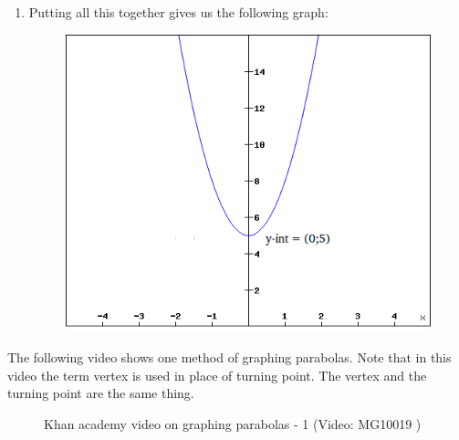 {\begin{mdframed}[linewidth=4, leftmargin=40, rightmargin=40]
\begin{exercise}
\begin{enumerate}[noitemsep, label=\textbf{Step} \textbf{\arabic*}. ]
{    }%
which is not real, so there are no x-intercepts.\item Putting all this together gives us the following graph:
    \setcounter{subfigure}{0}
	\begin{figure}[H] %
    \begin{center}
    \label{m39345*uid12459!!!underscore!!!media}\label{m39345*uid12459!!!underscore!!!printimage}\includegraphics{col11306.imgs/m39345_parabola.png} %
      \vspace{2pt}
    \vspace{.1in}
    \end{center}
 \end{figure}       
\end{enumerate}
    \end{exercise}
    \end{mdframed}
    }
    \noindent
\label{m39345*eip-297}The following video shows one method of graphing parabolas. Note that in this video the term vertex is used in place of turning point. The vertex and the turning point are the same thing.
    \setcounter{subfigure}{0}
	\begin{figure}[H] %
    \textnormal{Khan academy video on graphing parabolas - 1}\vspace{.1in} \nopagebreak
  \label{m39345*yt-media1}\label{m39345*yt-video1}
             { (Video:  MG10019 )}
      \vspace{2pt}
    \vspace{.1in}
 \end{figure}       \par \label{m39345*secfhsst!!!underscore!!!id2745}
